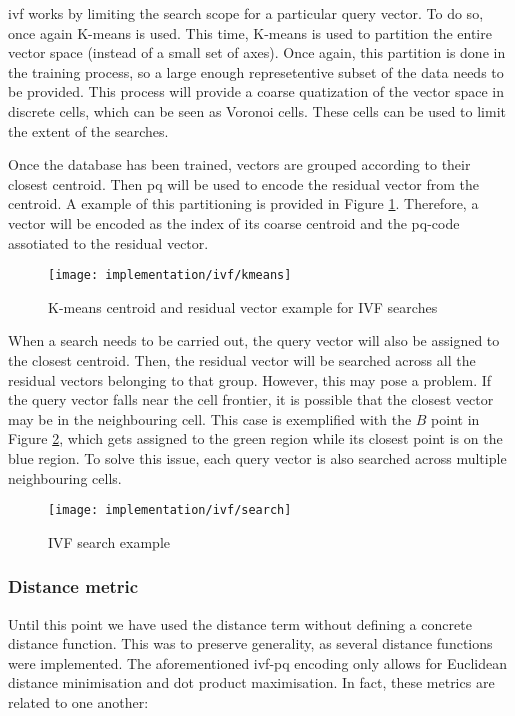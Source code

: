 \documentclass[../main.tex]{subfiles}
\begin{document}
\Gls{ivf} works by limiting the search scope for a particular query vector. To do so, once again K-means is used. This time, K-means is used to partition the entire vector space (instead of a small set of axes). Once again, this partition is done in the training process, so a large enough represetentive subset of the data needs to be provided. This process will provide a coarse quatization of the vector space in discrete cells, which can be seen as Voronoi cells\cite{chang2022b}. These cells can be used to limit the extent of the searches.

Once the database has been trained, vectors are grouped according to their closest centroid. Then \gls{pq} will be used to encode the residual vector from the centroid. A example of this partitioning is provided in Figure \ref{fig:4:ivf_kmeans}. Therefore, a vector will be encoded as the index of its coarse centroid and the \gls{pq}-code assotiated to the residual vector\cite{chang2022b}.

\begin{figure}[htbp]
    \centering
    \texttt{[image: implementation/ivf/kmeans]}
    \caption{K-means centroid and residual vector example for IVF searches}
    \label{fig:4:ivf_kmeans}
\end{figure}

When a search needs to be carried out, the query vector will also be assigned to the closest centroid. Then, the residual vector will be searched across all the residual vectors belonging to that group. However, this may pose a problem. If the query vector falls near the cell frontier, it is possible that the closest vector may be in the neighbouring cell. This case is exemplified with the $B$ point in Figure \ref{fig:4:ivf_search}, which gets assigned to the green region while its closest point is on the blue region. To solve this issue, each query vector is also searched across multiple neighbouring cells\cite{chang2022b}. 

\begin{figure}[htbp]
    \centering
    \texttt{[image: implementation/ivf/search]}
    \caption{IVF search example}
    \label{fig:4:ivf_search}
\end{figure}

\subsubsection{Distance metric}
Until this point we have used the distance term without defining a concrete distance function. This was to preserve generality, as several distance functions were implemented. The aforementioned \gls{ivf}-\gls{pq} encoding only allows for Euclidean distance minimisation and dot product maximisation. In fact, these metrics are related to one another:
\end{document}
